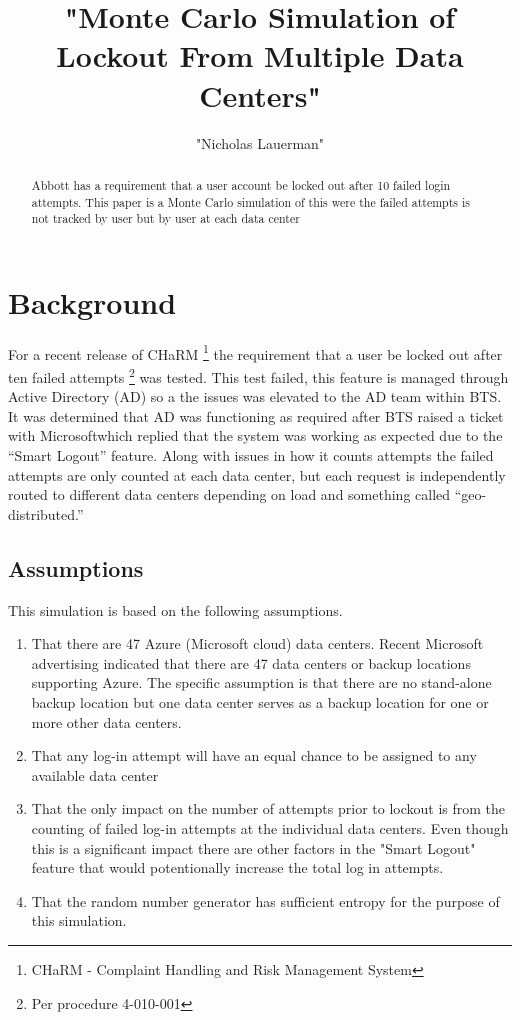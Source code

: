 \documentclass[11pt, letterpaper]{article}
\begin{document}
%



\title{"Monte Carlo Simulation of Lockout From Multiple Data Centers"}
\author{"Nicholas Lauerman"}
\date{}

\begin{abstract}
Abbott has a requirement that a user account be locked out after 10 failed login
attempts. This paper is a Monte Carlo simulation of this were the failed attempts
is not tracked by user but by user at each data center
\end{abstract}

\tableofcontents
\listoffigures
\listoftables

\section{Background}
For a recent release of CHaRM
\footnote{CHaRM - Complaint Handling and Risk Management System}
the requirement that a user be locked out after ten failed 	attempts
\footnote{Per procedure 4-010-001} was tested. This test failed, this
feature is managed through Active Directory (AD) so a the issues was
elevated to the AD team within BTS. It was determined that AD was
functioning as required after BTS raised a ticket with
Microsoft\texttrademark which replied that the system was working as
expected due to the ``Smart Logout'' feature. Along with issues in how it
counts attempts the failed attempts are only counted at each data center,
but each request is independently routed to different data centers
depending on 	load and something called ``geo-distributed.''

\subsection{Assumptions}
This simulation is based on the following assumptions.
\begin{enumerate}
\item That there are 47 Azure (Microsoft cloud) data centers.
Recent Microsoft advertising indicated that there are 47 data centers
or backup locations supporting Azure. The specific assumption is
that there are no stand-alone backup location but one data center
serves as a backup location for one or more other data centers.
\item That any log-in attempt will have an equal chance to be
assigned to any available data center
\item That the only impact on the number of attempts prior to lockout is
from the counting of failed log-in attempts at the individual data centers. Even though
this is a significant impact there are other factors in the "Smart Logout" feature
that would potentionally increase the total log in attempts.
\item That the random number generator has sufficient entropy for
the purpose of this simulation.
\end{enumerate}
\end{document}
